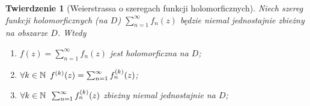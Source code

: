 \documentclass[11pt]{article}
\theoremstyle{plain}
\newtheorem*{theorem}{Twierdzenie}
\theoremstyle{definition}
\theoremstyle{remark}
\begin{document}
\begin{theorem}[Weierstrassa o szeregach funkcji holomorficznych]
  Niech szereg funkcji holomorficznych (na $D$) $ \sum_{n=1}^{\infty} f_n(z) $ będzie niemal jednostajnie zbieżny na obszarze $D$. Wtedy

  \begin{enumerate}
    \item $ f(z) = \sum_{n=1}^{\infty} f_n(z) $ jest holomorficzna na $ D $; \label{weierstrass-holo-f}
    \item $ \forall k \in \mathbb{N}\enskip f^{(k)}(z) = \sum_{n=1}^{\infty} f_n^{(k)}(z) $; \label{weierstrass-holo-pochodne}
    \item $ \forall k \in \mathbb{N}\enskip \sum_{n=1}^{\infty} f_n^{(k)}(z) $ zbieżny niemal jednostajnie na $D$; \label{weierstrass-holo-pochodne-zb}
  \end{enumerate}
\end{theorem}
\end{document}
